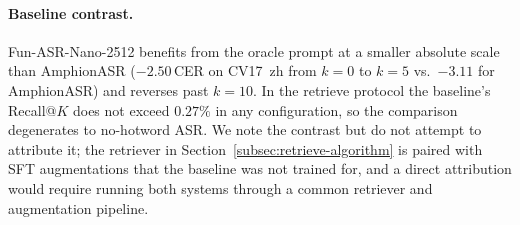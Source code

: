 \paragraph{Baseline contrast.}
Fun-ASR-Nano-2512 benefits from the oracle prompt at a smaller
absolute scale than AmphionASR ($-2.50$\,CER on CV17~zh from $k=0$
to $k=5$ vs.\ $-3.11$ for AmphionASR) and reverses past $k=10$.
In the retrieve protocol the baseline's Recall@$K$ does not exceed
$0.27\%$ in any configuration, so the comparison degenerates to
no-hotword ASR. We note the contrast but do not attempt to
attribute it; the retriever in
Section~\ref{subsec:retrieve-algorithm} is paired with SFT
augmentations that the baseline was not trained for, and a direct
attribution would require running both systems through a common
retriever and augmentation pipeline.
